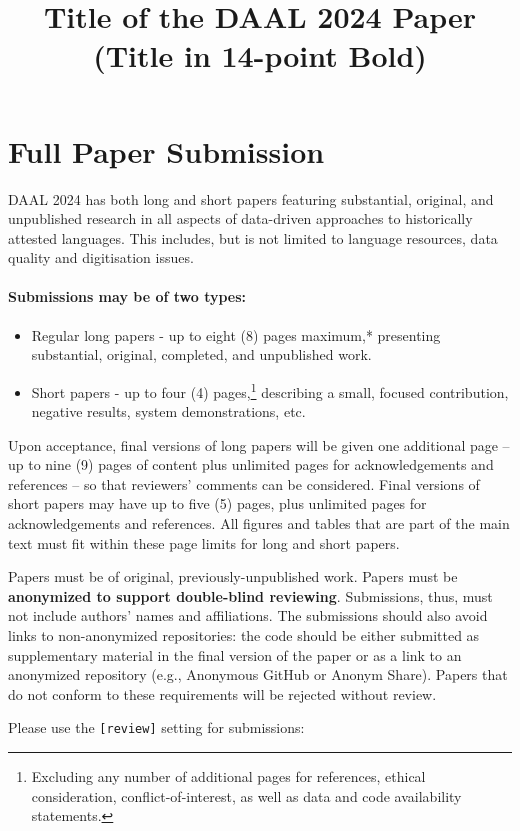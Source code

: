 \documentclass[10pt, a4paper]{article}
\title{Title of the DAAL 2024 Paper (Title in 14-point Bold)\\}
\begin{document}
\maketitleabstract

\section{Full Paper Submission}

DAAL 2024 has both long and short papers featuring substantial, original, and unpublished research in all aspects of data-driven approaches to historically attested languages. This includes, but is not limited to language resources, data quality and digitisation issues.

\paragraph{Submissions may be of two types:}

\begin{itemize}
\item Regular long papers - up to eight (8) pages maximum,* presenting substantial, original, completed, and unpublished work.
\item Short papers - up to four (4) pages,\footnote{Excluding any number of additional pages for references, ethical consideration, conflict-of-interest, as well as data and code availability statements.} describing a small, focused contribution, negative results, system demonstrations, etc.
\end{itemize}

Upon acceptance, final versions of long papers will be given one
additional page – up to nine (9) pages of content plus unlimited pages for acknowledgements and references – so that reviewers’ comments can be considered. Final versions of short papers may have up to five (5) pages, plus unlimited pages for acknowledgements and references. All figures and tables that are part of the main text must fit within these page limits for long and short papers.

Papers must be of original, previously-unpublished work. Papers must be \textbf{anonymized to support double-blind reviewing}. Submissions, thus, must not include authors’ names and affiliations. The submissions should also avoid links to non-anonymized repositories: the code should be either submitted as supplementary material in the final version of the paper or as a link to an anonymized repository (e.g., Anonymous GitHub or Anonym Share). Papers that do not conform to these requirements will be rejected without review.

Please use the \texttt{[review]} setting for submissions:
\end{document}
